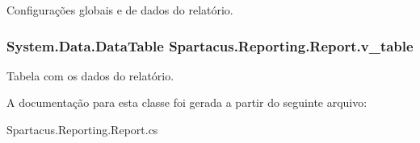 Configurações globais e de dados do relatório. 

\hypertarget{classSpartacus_1_1Reporting_1_1Report_a84089fdf49d60ce315a718f89a47c8b2}{
\subsubsection[{v\+\_\+table}]{\setlength{\rightskip}{0pt plus 5cm}System.\+Data.\+Data\+Table Spartacus.\+Reporting.\+Report.\+v\+\_\+table}}\label{classSpartacus_1_1Reporting_1_1Report_a84089fdf49d60ce315a718f89a47c8b2}


Tabela com os dados do relatório. 



A documentação para esta classe foi gerada a partir do seguinte arquivo\+:\begin{DoxyCompactItemize}
\item 
Spartacus.\+Reporting.\+Report.\+cs\end{DoxyCompactItemize}
